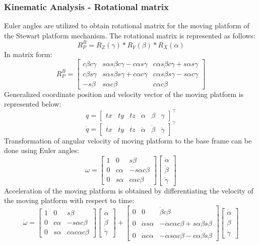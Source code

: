 \subsubsection{Kinematic Analysis - Rotational matrix}
Euler angles are utilized to obtain rotational matrix for the moving platform of the Stewart platform mechanism. The rotational matrix is represented as follows:
\begin{equation}
 R_{P}^B = R_{Z}(\gamma)*R_{Y}(\beta)*R_{X}(\alpha)
\end{equation}
In matrix form:
\[ R_{P}^B =
 \begin{bmatrix}
 c\beta c\gamma & s\alpha s\beta c\gamma - c\alpha s\gamma & c\alpha s\beta c\gamma + s\alpha s\gamma\\
 c\beta s\gamma & s\alpha s\beta s\gamma + c\alpha c\gamma & c\alpha s\beta s\gamma - s\alpha c\gamma\\
 -s\beta & s\alpha c\beta & c\alpha c\beta  
 \end{bmatrix}
\]
Generalized coordinate position and velocity vector of the moving platform is represented below:
\[
q=
\begin{bmatrix}
tx & ty & tz & \alpha & \beta & \gamma
\end{bmatrix}^\top
\]
\[
\dot{q}=
\begin{bmatrix}
\dot{tx} & \dot{ty} & \dot{tz} & \dot{\alpha} & \dot{\beta} & \dot{\gamma}
\end{bmatrix}^\top
\]
Transformation of angular velocity of moving platform to the base frame can be done using Euler angles:
\[
\omega =
\begin{bmatrix}
1 & 0 & s\beta \\
0 & c\alpha & -s\alpha c\beta \\
0 & s\alpha & c\alpha c\beta 
\end{bmatrix}
\begin{bmatrix}
\dot{\alpha} \\
\dot{\beta}\\
\dot{\gamma}
\end{bmatrix}
\]
Acceleration of the moving platform is obtained by differentiating the velocity of the moving platform with respect to time:
\[
\dot{\omega} =
\begin{bmatrix}
1 & 0 & s\beta \\
0 & c\alpha & -s\alpha c\beta \\
0 & s\alpha & c\alpha c\alpha c\beta 
\end{bmatrix}
\begin{bmatrix}
\ddot{\alpha} \\
\ddot{\beta}\\
\ddot{\gamma}
\end{bmatrix}
+
\begin{bmatrix}
0 & 0 & \dot{\beta}c\beta \\
0 & \dot{\alpha} s\alpha & -\dot{\alpha} c\alpha c\beta + s\alpha \dot{\beta} s\beta \\
0 & \dot{\alpha}c\alpha & -\dot{\alpha}s\alpha c\beta - c\alpha \dot{\beta}s\beta
\end{bmatrix}
\begin{bmatrix}
\dot{\alpha} \\
\dot{\beta}\\
\dot{\gamma}
\end{bmatrix}
\]
